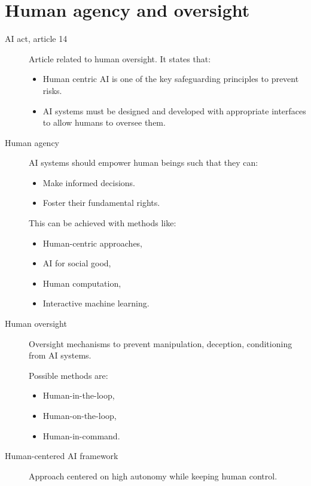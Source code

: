\chapter{Human agency and oversight}


\begin{description}
    \item[AI act, article 14] 
        Article related to human oversight. It states that:
        \begin{itemize}
            \item Human centric AI is one of the key safeguarding principles to prevent risks.
            \item AI systems must be designed and developed with appropriate interfaces to allow humans to oversee them.
        \end{itemize}
\end{description}


\begin{description}
    \item[Human agency] 
        AI systems should empower human beings such that they can:
        \begin{itemize}
            \item Make informed decisions.
            \item Foster their fundamental rights.
        \end{itemize}

        This can be achieved with methods like:
        \begin{itemize}
            \item Human-centric approaches,
            \item AI for social good,
            \item Human computation,
            \item Interactive machine learning.
        \end{itemize}

    \item[Human oversight] 
        Oversight mechanisms to prevent manipulation, deception, conditioning from AI systems.
        
        Possible methods are:
        \begin{itemize}
            \item Human-in-the-loop,
            \item Human-on-the-loop,
            \item Human-in-command.
        \end{itemize}

    \item[Human-centered AI framework] 
        Approach centered on high autonomy while keeping human control.
\end{description}

